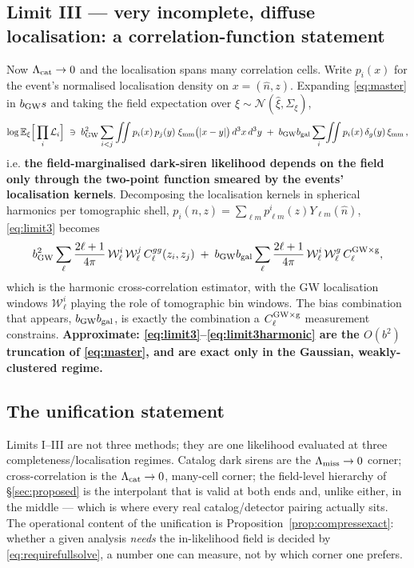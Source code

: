 \subsection{Limit III --- very incomplete, diffuse localisation: a correlation-function statement}

Now $\Lambda_{\rm cat}\to0$ and the localisation spans many correlation cells.
Write $p_i(x)$ for the event's normalised localisation density on
$x=(\hat n,z)$.  Expanding \eqref{eq:master} in $b_{\rm GW}s$ and taking the
field expectation over $\xi\sim\mathcal N(\hat\xi,\Sigma_\xi)$,
\begin{equation}
  \log\mathbb E_\xi\Big[\prod_i\mathcal L_i\Big]
  \;\ni\;
  b_{\rm GW}^2\sum_{i<j}
  \iint p_i(x)\,p_j(y)\;\xi_{\rm mm}\big(|x-y|\big)\,d^3x\,d^3y
  \;+\;b_{\rm GW}b_{\rm gal}\sum_i\!\iint p_i(x)\,\delta_g(y)\,\xi_{\rm mm}\,,
  \label{eq:limit3}
\end{equation}
i.e. \textbf{the field-marginalised dark-siren likelihood depends on the field
only through the two-point function smeared by the events' localisation
kernels}.  Decomposing the localisation kernels in spherical harmonics per
tomographic shell, $p_i(\hat n,z)=\sum_{\ell m}p^i_{\ell m}(z)Y_{\ell m}(\hat n)$,
\eqref{eq:limit3} becomes
\begin{equation}
  b_{\rm GW}^2\sum_{\ell}\frac{2\ell+1}{4\pi}\,
  \mathcal W^{i}_{\ell}\,\mathcal W^{j}_{\ell}\,C_\ell^{gg}(z_i,z_j)
  \;+\;
  b_{\rm GW}b_{\rm gal}\sum_\ell\frac{2\ell+1}{4\pi}\,
  \mathcal W^i_\ell\,\mathcal W^{g}_\ell\,C_\ell^{\rm GW\times g},
  \label{eq:limit3harmonic}
\end{equation}
which is the harmonic cross-correlation estimator, with the GW localisation
windows $\mathcal W^i_\ell$ playing the role of tomographic bin windows.  The
bias combination that appears, $b_{\rm GW}b_{\rm gal}$, is exactly the
combination a $C_\ell^{\rm GW\times g}$ measurement constrains.
\textbf{Approximate: \eqref{eq:limit3}--\eqref{eq:limit3harmonic} are the
$O(b^2)$ truncation of \eqref{eq:master}, and are exact only in the Gaussian,
weakly-clustered regime.}

\subsection{The unification statement}

Limits I--III are not three methods; they are one likelihood evaluated at three
completeness/localisation regimes.  Catalog dark sirens are the
$\Lambda_{\rm miss}\to0$ corner; cross-correlation is the
$\Lambda_{\rm cat}\to0$, many-cell corner; the field-level hierarchy of
\S\ref{sec:proposed} is the interpolant that is valid at both ends and, unlike
either, in the middle --- which is where every real catalog/detector pairing
actually sits.  The operational content of the unification is
Proposition~\ref{prop:compressexact}: whether a given analysis \emph{needs} the
in-likelihood field is decided by \eqref{eq:requirefullsolve}, a number one can
measure, not by which corner one prefers.

